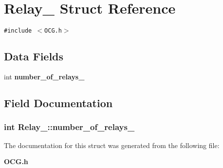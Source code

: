\section{Relay\_\- Struct Reference}
\label{structRelay__}
{\tt \#include $<$OCG.h$>$}

\subsection*{Data Fields}
\begin{CompactItemize}
\item 
int {\bf number\_\-of\_\-relays\_\-}
\end{CompactItemize}


\subsection{Field Documentation}
\subsubsection[{number\_\-of\_\-relays\_\-}]{\setlength{\rightskip}{0pt plus 5cm}int {\bf Relay\_\-::number\_\-of\_\-relays\_\-}}\label{structRelay___f436d9ba8507d6ef2aa33c2c33bda3df}




The documentation for this struct was generated from the following file:\begin{CompactItemize}
\item 
{\bf OCG.h}\end{CompactItemize}

